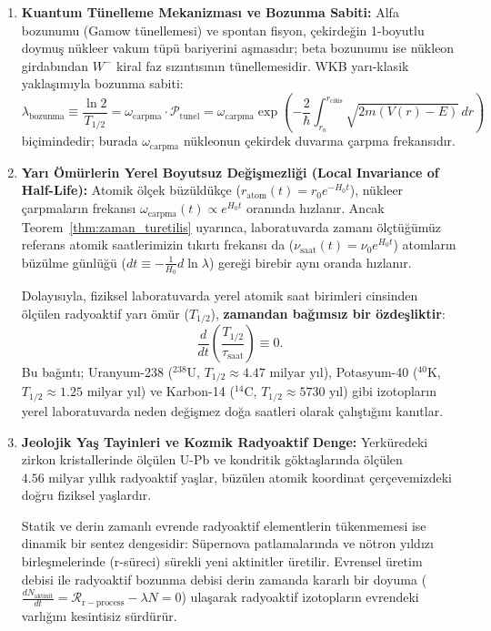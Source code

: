 \begin{enumerate}
    \item \textbf{Kuantum Tünelleme Mekanizması ve Bozunma Sabiti:}
          Alfa bozunumu (Gamow tünellemesi) ve spontan fisyon, çekirdeğin 1-boyutlu doymuş nükleer vakum tüpü bariyerini aşmasıdır; beta bozunumu ise nükleon girdabından $W^-$ kiral faz sızıntısının tünellemesidir. WKB yarı-klasik yaklaşımıyla bozunma sabiti:
          \begin{equation}
              \lambda_{\mathrm{bozunma}} \equiv \frac{\ln 2}{T_{1/2}} = \omega_{\mathrm{carpma}} \cdot \mathcal{P}_{\mathrm{tunel}} = \omega_{\mathrm{carpma}} \exp\left( - \frac{2}{\hbar} \int_{r_n}^{r_{\mathrm{cikis}}} \sqrt{2m\left(V(r) - E\right)} \, dr \right)
              \label{eq:bozunma_sabiti_genel}
          \end{equation}
          biçimindedir; burada $\omega_{\mathrm{carpma}}$ nükleonun çekirdek duvarına çarpma frekansıdır.
    \item \textbf{Yarı Ömürlerin Yerel Boyutsuz Değişmezliği (Local Invariance of Half-Life):}
          Atomik ölçek büzüldükçe ($r_{\mathrm{atom}}(t) = r_0 e^{-H_0 t}$), nükleer çarpmaların frekansı $\omega_{\mathrm{carpma}}(t) \propto e^{H_0 t}$ oranında hızlanır. Ancak Teorem~\ref{thm:zaman_turetilis} uyarınca, laboratuvarda zamanı ölçtüğümüz referans atomik saatlerimizin tıkırtı frekansı da ($\nu_{\mathrm{saat}}(t) = \nu_0 e^{H_0 t}$) atomların büzülme günlüğü ($dt \equiv -\frac{1}{H_0} d\ln\lambda$) gereği birebir aynı oranda hızlanır.

          Dolayısıyla, fiziksel laboratuvarda yerel atomik saat birimleri cinsinden ölçülen radyoaktif yarı ömür ($T_{1/2}$), \textbf{zamandan bağımsız bir özdeşliktir}:
          \begin{equation}
              \frac{d}{dt} \left( \frac{T_{1/2}}{\tau_{\mathrm{saat}}} \right) \equiv 0.
              \label{eq:yari_omur_degismezlik}
          \end{equation}
          Bu bağıntı; Uranyum-238 ($^{238}\mathrm{U}$, $T_{1/2} \approx 4.47\text{ milyar yıl}$), Potasyum-40 ($^{40}\mathrm{K}$, $T_{1/2} \approx 1.25\text{ milyar yıl}$) ve Karbon-14 ($^{14}\mathrm{C}$, $T_{1/2} \approx 5730\text{ yıl}$) gibi izotopların yerel laboratuvarda neden değişmez doğa saatleri olarak çalıştığını kanıtlar.
    \item \textbf{Jeolojik Yaş Tayinleri ve Kozmik Radyoaktif Denge:}
          Yerküredeki zirkon kristallerinde ölçülen U-Pb ve kondritik göktaşlarında ölçülen $4.56\text{ milyar yıllık}$ radyoaktif yaşlar, büzülen atomik koordinat çerçevemizdeki doğru fiziksel yaşlardır.

          Statik ve derin zamanlı evrende radyoaktif elementlerin tükenmemesi ise dinamik bir sentez dengesidir: Süpernova patlamalarında ve nötron yıldızı birleşmelerinde (r-süreci) sürekli yeni aktinitler üretilir. Evrensel üretim debisi ile radyoaktif bozunma debisi derin zamanda kararlı bir doyuma ($\frac{dN_{\mathrm{aktinit}}}{dt} = \mathcal{R}_{\mathrm{r-process}} - \lambda N = 0$) ulaşarak radyoaktif izotopların evrendeki varlığını kesintisiz sürdürür.
\end{enumerate}

